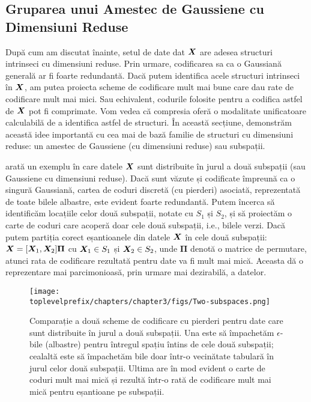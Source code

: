 \documentclass[../../book-main_ro.tex]{subfiles}
\begin{document}
\subsection{Gruparea unui Amestec de Gaussiene cu Dimensiuni Reduse}
\label{sec:clustering-Gaussians}
După cum am discutat înainte, setul de date dat $\bm{X}$ are adesea structuri intrinseci cu dimensiuni reduse. Prin urmare, codificarea sa ca o Gaussiană generală ar fi foarte redundantă. Dacă putem identifica acele structuri intrinseci în $\bm{X}$, am putea proiecta scheme de codificare mult mai bune care dau rate de codificare mult mai mici. Sau echivalent, codurile folosite pentru a codifica astfel de $\bm{X}$ pot fi comprimate. Vom vedea că compresia oferă o modalitate unificatoare calculabilă de a identifica astfel de structuri. În această secțiune, demonstrăm această idee importantă cu cea mai de bază familie de structuri cu dimensiuni reduse: un amestec de Gaussiene (cu dimensiuni reduse) sau subspații.

\begin{example}
	 arată un exemplu în care datele $\bm{X}$ sunt distribuite în jurul a două subspații (sau Gaussiene cu dimensiuni reduse). Dacă sunt văzute și codificate împreună ca o singură Gaussiană, cartea de coduri discretă (cu pierderi) asociată, reprezentată de toate bilele albastre, este evident foarte redundantă. Putem încerca să identificăm locațiile celor două subspații, notate cu $S_1$ și $S_2$, și să proiectăm o carte de coduri care acoperă doar cele două subspații, i.e., bilele verzi. Dacă putem partiția corect eșantioanele din datele $\bm{X}$ în cele două subspații: $\bm{X} = [\bm{X}_1, \bm{X}_2]\bm \Pi$ cu $\bm{X}_1 \in S_1$ și $\bm{X}_2 \in S_2$, unde $\bm \Pi$ denotă o matrice de permutare, atunci rata de codificare rezultată pentru date va fi mult mai mică. Aceasta dă o reprezentare mai parcimonioasă, prin urmare mai dezirabilă, a datelor.
\end{example}

\begin{figure}
	\centering
	\texttt{[image: \\toplevelprefix/chapters/chapter3/figs/Two-subspaces.png]}
	\caption{Comparație a două scheme de codificare cu pierderi pentru date care sunt distribuite în jurul a două subspații. Una este să împachetăm $\epsilon$-bile (albastre) pentru întregul spațiu întins de cele două subspații; cealaltă este să împachetăm bile doar într-o vecinătate tabulară în jurul celor două subspații. Ultima are în mod evident o carte de coduri mult mai mică și rezultă într-o rată de codificare mult mai mică pentru eșantioane pe subspații.}
	\label{fig:two-subspaces}
\end{figure}
\end{document}
